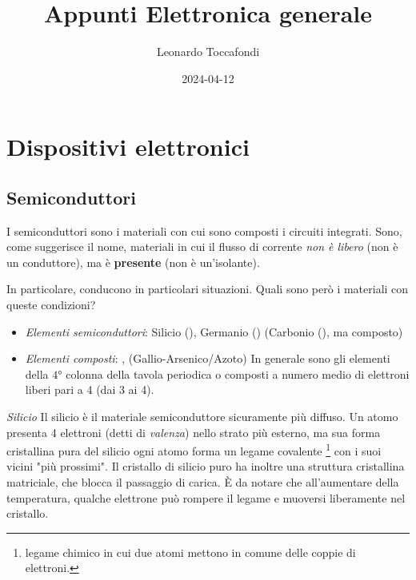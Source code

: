 \documentclass[
]{book}
\title{Appunti Elettronica generale}
\author{Leonardo Toccafondi}
\date{2024-04-12}
\providecommand{\tightlist}{%
  \setlength{\itemsep}{0pt}\setlength{\parskip}{0pt}}
\begin{document}
\frontmatter
\maketitle

{
\setcounter{tocdepth}{2}
\tableofcontents
}
\mainmatter
\chapter{Dispositivi elettronici}\label{dispositivi-elettronici}

\section{Semiconduttori}\label{semiconduttori}

I semiconduttori sono i materiali con cui sono composti i circuiti
integrati. Sono, come suggerisce il nome, materiali in cui il flusso di
corrente \emph{non è libero} (non è un conduttore), ma è
\textbf{presente} (non è un'isolante).

In particolare, conducono in particolari situazioni. Quali sono però i
materiali con queste condizioni?

\begin{itemize}
\tightlist
\item
  \emph{Elementi semiconduttori}: Silicio (), Germanio ()
  (Carbonio (), ma composto)
\item
  \emph{Elementi composti}: ,  (Gallio-Arsenico/Azoto)
  In generale sono gli elementi della \(4°\) colonna della tavola
  periodica o composti a numero medio di elettroni liberi pari a 4 (dai
  3 ai 4).
\end{itemize}

\begin{mybox}{\emph{Silicio}}
Il silicio è il materiale semiconduttore sicuramente più diffuso. \newline
Un atomo presenta 4 elettroni (detti di \emph{valenza}) nello strato più esterno,
ma sua forma cristallina pura del silicio ogni atomo forma un legame covalente
\footnote{legame chimico in cui due atomi mettono in comune delle coppie di elettroni.}
con i suoi vicini "più prossimi".
Il cristallo di silicio puro ha inoltre una struttura cristallina matriciale,
che blocca il passaggio di carica. \newline
È da notare che all'aumentare della temperatura, qualche elettrone può rompere il legame
e muoversi liberamente nel cristallo.
\end{mybox}
\end{document}
